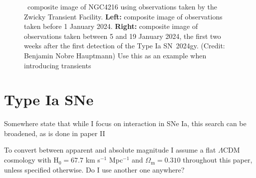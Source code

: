 \documentclass[a4paper,oneside,12pt, class=Latex/Classes/PhDthesisPSnPDF, crop=false]{standalone}
\begin{document}
\begin{figure}
    \caption{\ztfg\ztfr\ztfi\ composite image of NGC4216 using observations taken by the Zwicky Transient Facility. \textbf{Left:} composite image of observations taken before 1 January 2024. \textbf{Right:} composite image of observations taken between 5 and 19 January 2024, the first two weeks after the first detection of the Type Ia SN~2024gy. (Credit: Benjamin Nobre Hauptmann) \color{red}Use this as an example when introducing transients \color{black}} %
    \label{2024gy_ZTF}
\end{figure}

\section{Type Ia SNe}
\color{red}Somewhere state that while I focus on interaction in SNe Ia, this search can be broadened, as is done in paper II \color{black}

To convert between apparent and absolute magnitude I assume a flat $\Lambda$CDM cosmology with H$_0 = 67.7$ km s$^{-1}$ Mpc$^{-1}$ and $\Omega_\text{m} = 0.310$ \citep{Planck18VI} throughout this paper, unless specified otherwise. \color{red} Do I use another one anywhere? \color{black}
\end{document}
